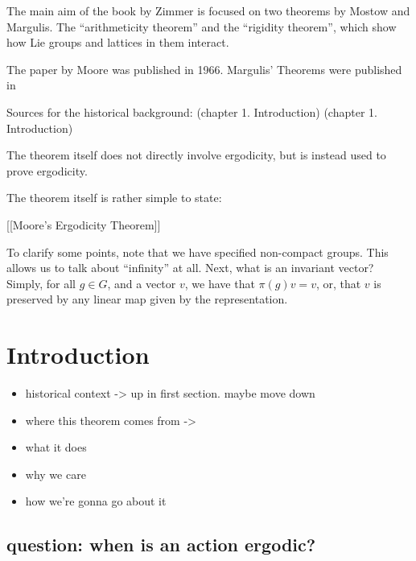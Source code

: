 \documentclass[
  12pt
]{article}
\theoremstyle{break}
\theoremstyle{plain}
\begin{document}
The main aim of the book by Zimmer is focused on two
theorems by Mostow and Margulis. The ``arithmeticity theorem'' and the
``rigidity theorem'', which show how Lie groups and lattices in them
interact. 


The paper by Moore \cite{Moore66} was published in 1966. Margulis' Theorems were published in 

Sources for the historical background: \cite{mackey74}(chapter 1.
Introduction) \cite{Zimmer84}(chapter 1. Introduction)

The theorem itself does not directly involve ergodicity, but is instead
used to prove ergodicity.

The theorem itself is rather simple to state:

{[}{[}Moore's Ergodicity Theorem{]}{]}

To clarify some points, note that we have specified non-compact groups.
This allows us to talk about ``infinity'' at all. Next, what is an
invariant vector? Simply, for all $g\in G$, and a vector $v$, we
have that $\pi(g)v = v$, or, that $v$ is preserved by any linear map
given by the representation.






\hypertarget{introduction}{\section{Introduction}\label{sec:introduction}}


  \begin{itemize}
    \item historical context -\textgreater{} up in first section. maybe move down
    \item where this theorem comes from -\textgreater{} \cite{howe79}
    \item what it does
    \item why we care
    \item how we're gonna go about it
  \end{itemize}

  \hypertarget{question-when-is-an-action-ergodic}{%
  \subsection{question: when is an action
  ergodic?}\label{question-when-is-an-action-ergodic}}
\end{document}
